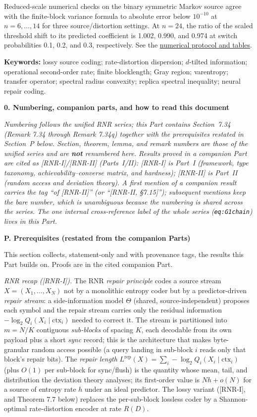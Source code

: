 \documentclass[
]{article}
\begin{document}
Reduced-scale numerical checks on the binary symmetric Markov source
agree with the finite-block variance formula to absolute error below
$10^{-10}$ at $n=6,\ldots,14$ for three source/distortion settings. At
$n=24$, the ratio of the scaled threshold shift to its predicted
coefficient is 1.002, 0.990, and 0.974 at switch probabilities 0.1, 0.2,
and 0.3, respectively. See the
\href{https://github.com/ratushnyi-labs/sci-rnr/blob/d287c6f18fa8dccbbca10b705e408c6e528edfb3/experiments/part3_dispersion/README.md}{numerical protocol and tables}.

\textbf{Keywords:} lossy source coding; rate-distortion dispersion;
$d$-tilted information; operational second-order rate; finite blocklength;
Gray region; varentropy; transfer operator; spectral radius convexity;
replica spectral inequality; neural repair coding.

\textbf{0. Numbering, companion parts, and how to read this document}

\emph{Numbering follows the unified RNR series; this Part contains
Section~7.34 (Remark 7.34 through Remark 7.34q) together with the
prerequisites restated in Section~P below. Section, theorem, lemma, and
remark numbers are those of the unified series and are \textbf{not}
renumbered here. Results proved in a companion Part are cited as
[RNR-I]/[RNR-II] (Parts~I/II): [RNR-I] is Part~I (framework, type taxonomy,
achievability--converse matrix, and hardness); [RNR-II] is Part~II (random
access and deviation theory). A first mention of a companion result carries
the tag ``of [RNR-II]'' (or ``[RNR-II, \S7.15]''); subsequent mentions keep
the bare number, which is unambiguous because the numbering is shared across
the series. The one internal cross-reference label of the whole series
(\texttt{eq:G1chain}) lives in this Part.}

\textbf{P. Prerequisites (restated from the companion Parts)}

This section collects, statement-only and with provenance tags, the results
this Part builds on. Proofs are in the cited companion Part.

\emph{RNR recap ([RNR-I]).} The RNR \emph{repair principle} codes a source
stream $X=(X_1,\dots,X_N)$ not by a monolithic entropy coder but by a
predictor-driven \emph{repair stream}: a side-information model $\Theta$
(shared, source-independent) proposes each symbol and the repair stream
carries only the residual information $-\log_2 Q_i(X_i\mid\mathrm{ctx}_i)$
needed to correct it. The stream is partitioned into $m=N/K$ contiguous
\emph{sub-blocks} of spacing $K$, each decodable from its own payload plus a
short \emph{sync} record; this is the architecture that makes byte-granular
random access possible (a query landing in sub-block $i$ reads only that
block's repair bits). The \emph{repair length}
$L^{\mathrm{rep}}(X)=\sum_i -\log_2 Q_i(X_i\mid\mathrm{ctx}_i)$ (plus $O(1)$
per sub-block for sync/flush) is the quantity whose mean, tail, and
distribution the deviation theory analyses; its first-order value is $Nh+o(N)$
for a source of entropy rate $h$ under an ideal predictor. The lossy variant
([RNR-I], and Theorem 7.7 below) replaces the per-sub-block lossless coder by
a Shannon-optimal rate-distortion encoder at rate $R(D)$.
\end{document}
